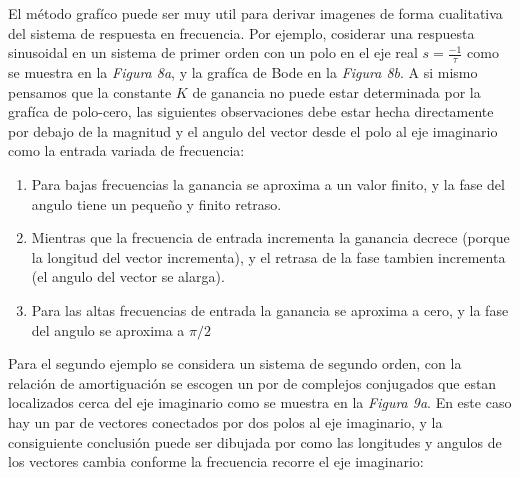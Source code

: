 \documentclass[10pt,a4paper]{article}
\begin{document}
El método grafíco puede ser muy util para derivar imagenes de forma cualitativa del sistema de respuesta en frecuencia. Por ejemplo, cosiderar una respuesta sinusoidal en un sistema de primer orden con un polo en el eje real $s=\frac{-1}{\tau}$ como se muestra en la \textit{Figura 8a}, y la grafíca de Bode en la \textit{Figura 8b}. A si mismo pensamos que la constante $K$ de ganancia no puede estar determinada por la grafíca de polo-cero, las siguientes observaciones debe estar hecha directamente por debajo de la magnitud y el angulo del vector desde el polo al eje imaginario como la entrada variada de frecuencia:
\begin{enumerate}
  \item Para bajas frecuencias la ganancia se aproxima a un valor finito, y la fase del angulo tiene un pequeño y finito retraso.
  \item Mientras que la frecuencia de entrada incrementa la ganancia decrece (porque la longitud del vector incrementa), y el retrasa de la fase tambien incrementa (el angulo del vector se alarga).
  \item Para las altas frecuencias de entrada la ganancia se aproxima a cero, y la fase del angulo se aproxima a $\pi /2$
\end{enumerate}
Para el segundo ejemplo se considera un sistema de segundo orden, con la relación de amortiguación se escogen un por de complejos conjugados que estan localizados cerca del eje imaginario  como se muestra en la \textit{Figura 9a}. En este caso hay un par de vectores conectados por dos polos al eje imaginario, y la consiguiente conclusión puede ser dibujada por como las longitudes y angulos de los vectores cambia conforme la frecuencia recorre el eje imaginario:
\end{document}
